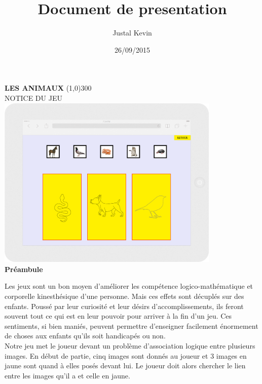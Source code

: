 \documentclass{article}
\title{Document de presentation}
\author{Justal Kevin}
\date{26/09/2015}
\begin{document}
\begin{center}
\textbf{\Huge{LES ANIMAUX}}
\line(1,0){300}\\
NOTICE DU JEU\\
\vspace{3cm}
\includegraphics[width=0.8\textwidth]{tablette}\\
\vspace{3cm}
\textbf{Pr\'eambule}
\end{center}

\hspace*{0.6cm}Les jeux sont un bon moyen d'am\'eliorer les comp\'etence logico-math\'ematique et corporelle kinesth\'esique d'une personne. Mais ces effets sont d\'ecupl\'es sur des enfants. Pouss\'e par leur curiosit\'e et leur d\'esirs d'accomplissements, ils feront souvent tout ce qui est en leur pouvoir pour arriver \`a la fin d'un jeu. Ces sentiments, si bien mani\'es, peuvent permettre d'enseigner facilement \'enormement de choses aux enfants qu'ils soit handicap\'es ou non.
\vspace{0.5cm}\\
\hspace*{0.6cm}Notre jeu met le joueur devant un problème d'association logique entre plusieurs images. En d\'ebut de partie, cinq images sont donn\'es au joueur et 3 images en jaune sont quand \`a elles pos\'es devant lui. Le joueur doit alors chercher le lien entre les images qu'il a et celle en jaune.

\newpage
\tableofcontents

\newpage
\end{document}
